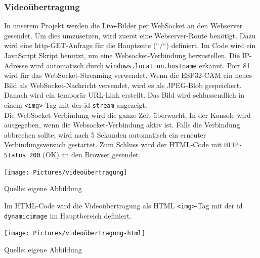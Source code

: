 \documentclass[ngerman,12pt,a4paper]{article}
\begin{document}
			\subsubsection{Videoübertragung}
			In unserem Projekt werden die Live-Bilder per WebSocket an den Webserver gesendet. Um dies umzusetzen, wird zuerst eine Webserver-Route benötigt. Dazu wird eine http-GET-Anfrage für die Hauptseite (“/“) definiert. Im Code wird ein JavaScript Skript benutzt, um eine Websocket-Verbindung herzustellen. Die IP-Adresse wird automatisch durch \texttt{windows.location.hostname} erkannt. Port 81 wird für das WebSocket-Streaming verwendet. Wenn die ESP32-CAM ein neues Bild als WebSocket-Nachricht versendet, wird es als JPEG-Blob gespeichert. Danach wird ein temporär URL-Link erstellt. Das Bild wird schlussendlich in einem \texttt{<img>}-Tag mit der id \texttt{stream} angezeigt. \\
			Die WebSocket Verbindung wird die ganze Zeit überwacht. In der Konsole wird ausgegeben, wenn die Websocket-Verbindung aktiv ist. Falls die Verbindung abbrechen sollte, wird nach 5 Sekunden automatisch ein erneuter Verbindungsversuch gestartet. Zum Schluss wird der HTML-Code mit \texttt{HTTP-Status 200} (OK) an den Browser gesendet.
			\begin{center}
				\begin{minipage}[t]{0.75\textwidth}
					\texttt{[image: Pictures/videoübertragung]}
					\label{fig:Videoübertragung}
					\vspace{-10pt}
					\begin{center}
						\par\small Quelle: eigene Abbildung 
					\end{center}
				\end{minipage}
			\end{center}
			\noindent
			Im HTML-Code wird die Videoübertragung als HTML \texttt{<img>}-Tag mit der id \texttt{dynamicimage} im Hauptbereich definiert.
			\begin{center}
				\begin{minipage}[t]{0.75\textwidth}
					\texttt{[image: Pictures/videoübertragung-html]}
					\label{fig:videoübertragung-html}
					\vspace{-10pt}
					\begin{center}
						\par\small Quelle: eigene Abbildung 
					\end{center}
				\end{minipage} \\[0.70cm]
			\end{center}
\end{document}
